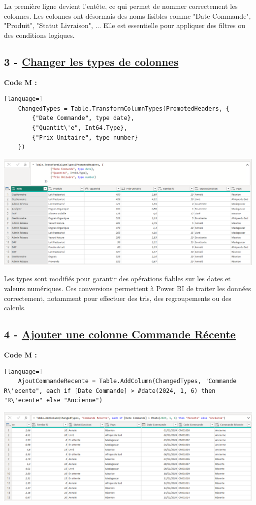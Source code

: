 \documentclass[12pt,a4paper]{article}
\begin{document}
    La premi\`ere ligne devient l'ent\^ete, ce qui permet de nommer correctement les colonnes. Les colonnes ont désormais des noms lisibles comme "Date Commande", "Produit", "Statut Livraison", ... Elle est essentielle pour appliquer des filtres ou des conditions logiques.


	\newpage
    
    \subsection*{3 - \textbf{\underline{Changer les types de colonnes}} }
    \textbf{Code M :}
    \begin{lstlisting}[language=]
    ChangedTypes = Table.TransformColumnTypes(PromotedHeaders, {
        {"Date Commande", type date}, 
        {"Quantit\'e", Int64.Type}, 
        {"Prix Unitaire", type number}
    })
    \end{lstlisting}

	\includegraphics[width=\textwidth]{etape3.png}


     Les types sont modifi\'es pour garantir des op\'erations fiables sur les dates et valeurs num\'eriques. Ces conversions permettent à Power BI de traiter les données correctement, notamment pour effectuer des tris, des regroupements ou des calculs.

    

    \subsection*{4 - \textbf{\underline{Ajouter une colonne \og Commande R\'ecente\fg}}} 
    \textbf{Code M :}
    \begin{lstlisting}[language=]
    AjoutCommandeRecente = Table.AddColumn(ChangedTypes, "Commande R\'ecente", each if [Date Commande] > #date(2024, 1, 6) then "R\'ecente" else "Ancienne")
    \end{lstlisting}

	\includegraphics[width=\textwidth]{etape4.png}
\end{document}

